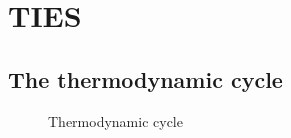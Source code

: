\section{TIES}

\subsection{The thermodynamic cycle}

\begin{figure}
  \centering
  
  \caption{Thermodynamic cycle}
  \label{fig:tiescycle}
\end{figure}